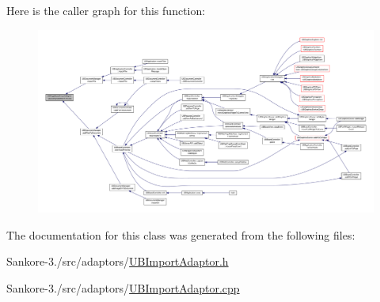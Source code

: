 Here is the caller graph for this function\-:
\nopagebreak
\begin{figure}[H]
\begin{center}
\leavevmode
\includegraphics[width=350pt]{d5/d38/class_u_b_page_based_import_adaptor_a1e9d5e4e33abbe6982db4292cdd9ec7a_icgraph}
\end{center}
\end{figure}




The documentation for this class was generated from the following files\-:\begin{DoxyCompactItemize}
\item 
Sankore-\/3./src/adaptors/\hyperlink{_u_b_import_adaptor_8h}{U\-B\-Import\-Adaptor.\-h}\item 
Sankore-\/3./src/adaptors/\hyperlink{_u_b_import_adaptor_8cpp}{U\-B\-Import\-Adaptor.\-cpp}\end{DoxyCompactItemize}
